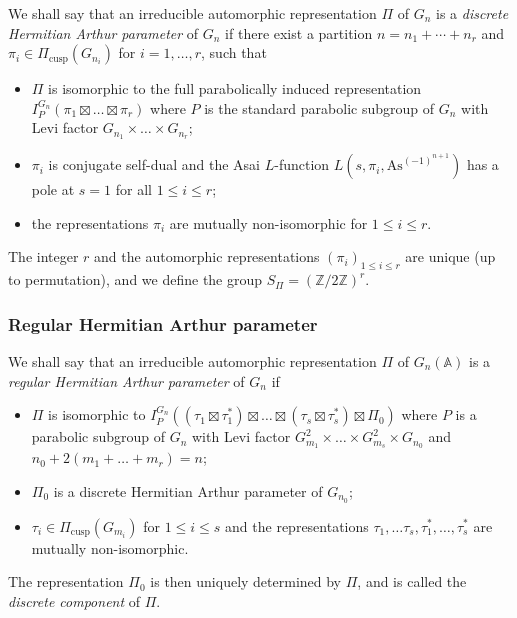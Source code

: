\documentclass[letterpaper,11pt]{amsart}
\newcommand{\bA}{\mathbb{A}}
\newcommand{\Z}{\mathbb{Z}}
\newcommand{\<}{\negthickspace}
\DeclareMathOperator{\cusp}{cusp}
\theoremstyle{definition}
\theoremstyle{plain}
\theoremstyle{remark}
\numberwithin{equation}{section}
\begin{document}
We shall say that an irreducible automorphic representation $\Pi$ of $G_n$ is a \emph{discrete Hermitian Arthur parameter} of $G_n$ if there exist a partition $n = n_1 + \cdots + n_r$ and $\pi_i \in \Pi_{\cusp}(G_{n_i})$ for $i = 1, \hdots, r$, such that
\begin{itemize}
    \item $\Pi$ is isomorphic to the full parabolically induced representation
        $I_P^{G_n}(\pi_1 \boxtimes \hdots \boxtimes \pi_r)$ where $P$ is the
        standard parabolic subgroup of $G_n$ with Levi factor $G_{n_1} \times \hdots
        \times G_{n_r}$;
    \item $\pi_i$ is conjugate self-dual and the Asai
        $L$-function $L(s,\pi_i,\mathrm{As}^{(-1)^{n+1}})$ has a pole at
        $s=1$ for all $1 \leq i \leq r$;
    \item the representations $\pi_i$ are mutually non-isomorphic for $1
        \leq i \leq r$.
\end{itemize}
The integer $r$ and the automorphic representations $(\pi_i)_{1 \leq i \leq r}$ are unique (up to permutation), and we define the group $S_\Pi=(\Z/2\Z)^r$.

\subsubsection{Regular Hermitian Arthur parameter}
\label{subsec:reg_herm_art}
    
We shall say that an irreducible automorphic representation $\Pi$ of
$G_n(\bA)$ is a \emph{regular Hermitian Arthur parameter} of $G_n$ if
\begin{itemize}
    \item $\Pi$ is isomorphic to 
        $I_P^{G_n}((\tau_1 \boxtimes \tau_1^*) \boxtimes \hdots \boxtimes (\tau_s \boxtimes \tau_s^*) \boxtimes \Pi_0)$ where $P$ is
        a parabolic subgroup of $G_n$ with Levi factor $G_{m_1}^2 \times
        \hdots \times G_{m_s}^2 \times G_{n_0}$ and $n_0+2(m_1 + \hdots + m_r)=n$;
    \item $\Pi_0$ is a discrete Hermitian Arthur parameter of $G_{n_0}$;
    \item $\tau_i \in \Pi_{\cusp}(G_{m_i})$ for $1 \leq i \leq s$ and the representations $\tau_1, \hdots \tau_s, \tau_1^*, \hdots,  \tau_s^*$ are mutually non-isomorphic.
\end{itemize}
The representation $\Pi_0$ is then uniquely determined by $\Pi$, and is
called the \emph{discrete component} of $\Pi$. 
\end{document}
